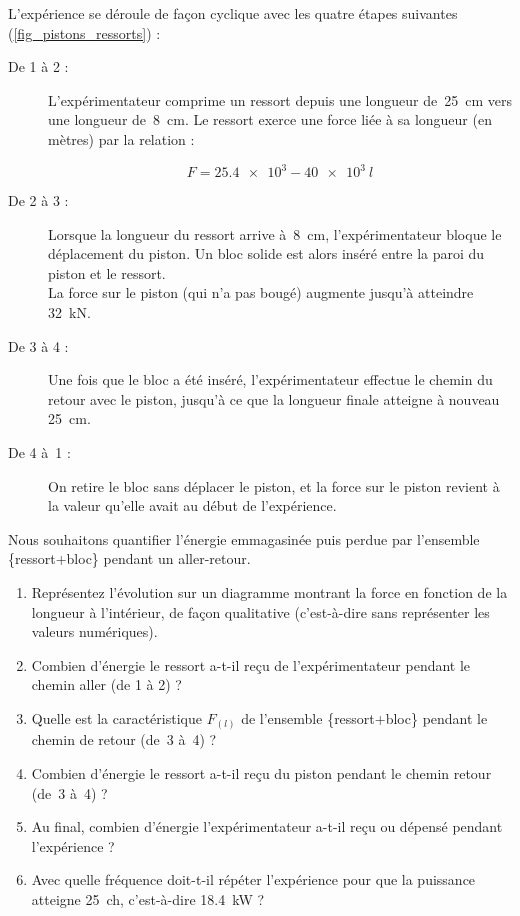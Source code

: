 	L’expérience se déroule de façon cyclique avec les quatre étapes suivantes (\cref{fig_pistons_ressorts}) :
	
	\begin{description}
		\item[De 1 à 2 :] L’expérimentateur comprime un ressort depuis une longueur de~\SI{25}{\centi\metre} vers une longueur de~\SI{8}{\centi\metre}.
		Le ressort exerce une force liée à sa longueur (en mètres) par la relation :
		
		\begin{equation}
			F = \num{25,4e3} - \num{40e3} \ l
		\end{equation}
		

		\item[De 2 à 3 :] Lorsque la longueur du ressort arrive à~\SI{8}{\centi\metre}, l’expérimentateur bloque le déplacement du piston. Un bloc solide est alors inséré entre la paroi du piston et le ressort. \\
		La force sur le piston (qui n’a pas bougé) augmente jusqu’à atteindre \SI{32}{\kilo\newton}.
		
		\item[De 3 à 4 :] Une fois que le bloc a été inséré, l’expérimentateur effectue le chemin du retour avec le piston, jusqu’à ce que la longueur finale atteigne à nouveau \SI{25}{\centi\metre}.
		
		\item[De 4 à~1 :] On retire le bloc sans déplacer le piston, et la force sur le piston revient à la valeur qu’elle avait au début de l’expérience.
	\end{description}
	
	Nous souhaitons quantifier l’énergie emmagasinée puis perdue par l’ensemble \{ressort+bloc\} pendant un aller-retour. 
	
	\begin{enumerate}
		\item Représentez l’évolution sur un diagramme montrant la force en fonction de la longueur à l’intérieur, de façon qualitative (c’est-à-dire sans représenter les valeurs numériques).
		\item Combien d’énergie le ressort a-t-il reçu de l’expérimentateur pendant le chemin aller (de 1 à 2) ?
		\item Quelle est la caractéristique $F_{(l)}$ de l’ensemble \{ressort+bloc\} pendant le chemin de retour (de~3 à~4) ?
		\item Combien d’énergie le ressort a-t-il reçu du piston pendant le chemin retour (de~3 à~4) ?
		\item Au final, combien d’énergie l’expérimentateur a-t-il reçu ou dépensé pendant l’expé\-rience ?
		\item Avec quelle fréquence doit-t-il répéter l’expérience pour que la puissance atteigne \SI{25}{ch}, c’est-à-dire \SI{18,4}{\kilo\watt} ?
	\end{enumerate}



